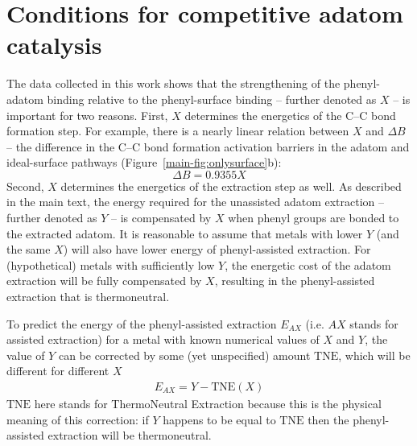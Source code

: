 \documentclass[aps,prl,reprint,amsmath,amssymb,floatfix,notitlepage]{revtex4-1}
\begin{document}
\section{Conditions for competitive adatom catalysis}


The data collected in this work shows that the strengthening of the phenyl-adatom binding relative to the phenyl-surface binding -- further denoted as $X$ -- is important for two reasons. First, $X$ determines the energetics of the C--C bond formation step. For example, there is a nearly linear relation between $X$ and $\Delta B$ -- the difference in the C--C bond formation activation barriers in the adatom and ideal-surface pathways (Figure~\ref{main-fig:onlysurface}b):
% 
\begin{equation} \label{eq:relation1}
\Delta B = 0.9355 X
\end{equation}
%
Second, $X$ determines the energetics of the extraction step as well. As described in the main text, the energy required for the unassisted adatom extraction -- further denoted as $Y$ -- is compensated by $X$ when phenyl groups are bonded to the extracted adatom. It is reasonable to assume that metals with lower $Y$ (and the same $X$) will also have lower energy of phenyl-assisted extraction. For (hypothetical) metals with sufficiently low $Y$, the energetic cost of the adatom extraction will be fully compensated by $X$, resulting in the phenyl-assisted extraction that is thermoneutral. 

To predict the energy of the phenyl-assisted extraction $E_{AX}$ (i.e. $AX$ stands for assisted extraction) for a metal with known numerical values of $X$ and $Y$, the value of $Y$ can be corrected by some (yet unspecified) amount $\text{TNE}$, which will be different for different $X$
%
\begin{equation} \label{eq:relation2}
\begin{split}
E_{AX} = Y - \text{TNE}(X)
\end{split}
\end{equation}
%
$\text{TNE}$ here stands for ThermoNeutral Extraction because this is the physical meaning of this correction: if $Y$ happens to be equal to $\text{TNE}$ then the phenyl-assisted extraction will be thermoneutral.
\end{document}
